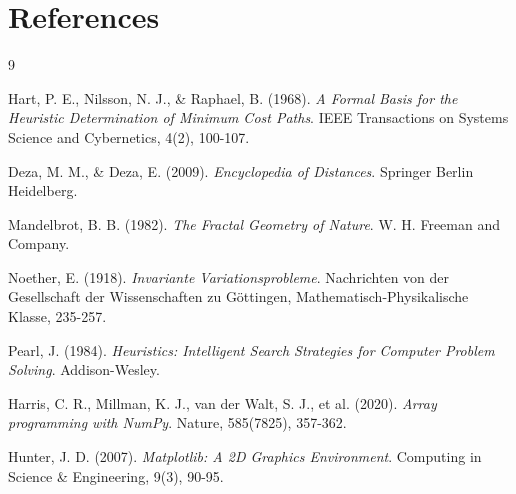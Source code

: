 \documentclass{article}
\begin{document}
\section{References}

\begin{thebibliography}{9}

Hart, P. E., Nilsson, N. J., \& Raphael, B. (1968).
\textit{A Formal Basis for the Heuristic Determination of Minimum Cost Paths}.
IEEE Transactions on Systems Science and Cybernetics, 4(2), 100-107.

Deza, M. M., \& Deza, E. (2009).
\textit{Encyclopedia of Distances}.
Springer Berlin Heidelberg.

Mandelbrot, B. B. (1982).
\textit{The Fractal Geometry of Nature}.
W. H. Freeman and Company.

Noether, E. (1918).
\textit{Invariante Variationsprobleme}.
Nachrichten von der Gesellschaft der Wissenschaften zu Göttingen, Mathematisch-Physikalische Klasse, 235-257.

Pearl, J. (1984).
\textit{Heuristics: Intelligent Search Strategies for Computer Problem Solving}.
Addison-Wesley.

Harris, C. R., Millman, K. J., van der Walt, S. J., et al. (2020).
\textit{Array programming with NumPy}.
Nature, 585(7825), 357-362.

Hunter, J. D. (2007).
\textit{Matplotlib: A 2D Graphics Environment}.
Computing in Science \& Engineering, 9(3), 90-95.

\end{thebibliography}
\end{document}
